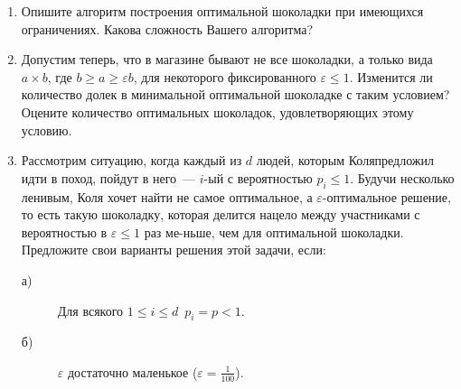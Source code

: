 \begin{enumerate}
\item Опишите алгоритм построения оптимальной шоколадки при имеющихся ограничениях. Какова сложность Вашего алгоритма?
\item Допустим теперь, что в магазине бывают не все шоколадки, а только вида $a\times b$, где $b\geq a\geq \varepsilon b$, для некоторого фиксированного $\varepsilon\leq 1$. Изменится ли количество долек в минимальной оптимальной шоколадке с таким условием? Оцените количество оптимальных шоколадок, удовлетворяющих этому условию.
\item Рассмотрим ситуацию, когда каждый из $d$ людей, которым Коля\linebreak предложил идти в поход, пойдут в него~— $i$-ый с вероятностью $p_i\leq 1$. Будучи несколько ленивым, Коля хочет найти не самое оптимальное, а $\varepsilon$-оптимальное решение, то есть такую шоколадку, которая делится нацело между участниками с вероятностью в $\varepsilon\leq 1$ раз ме-\linebreak ньше, чем для оптимальной шоколадки.
Предложите свои варианты решения этой задачи, если:
\begin{description}
\item [а)] Для всякого $1\leq i\leq d\,$ $p_i=p<1$.
\item [б)] $\varepsilon$ достаточно маленькое ($\varepsilon=\frac{1}{100}$).
\end{description}

\end{enumerate}



